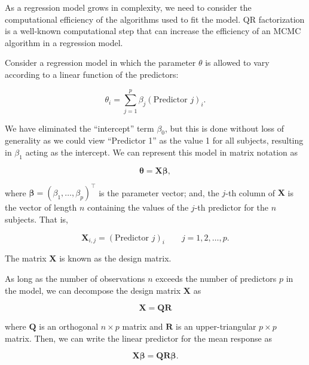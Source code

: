 \documentclass[
  letterpaper,
  DIV=11,
  numbers=noendperiod]{scrreprt}
\theoremstyle{definition}
\theoremstyle{plain}
\theoremstyle{definition}
\theoremstyle{remark}
\begin{document}
\providecommand{\norm}[1]{\lVert#1\rVert}
\providecommand{\abs}[1]{\lvert#1\rvert}
\providecommand{\iid}{\stackrel{\text{IID}}{\sim}}
\providecommand{\ind}{\stackrel{\text{Ind}}{\sim}}

\providecommand{\bm}[1]{\mathbf{#1}}
\providecommand{\bs}[1]{\boldsymbol{#1}}
\providecommand{\bbeta}{\bs{\beta}}

\providecommand{\Ell}{\mathcal{L}}
\providecommand{\indep}{\perp\negthickspace\negmedspace\perp}

As a regression model grows in complexity, we need to consider the
computational efficiency of the algorithms used to fit the model. QR
factorization is a well-known computational step that can increase the
efficiency of an MCMC algorithm in a regression model.

Consider a regression model in which the parameter \(\theta\) is allowed
to vary according to a linear function of the predictors:

\[\theta_i = \sum_{j=1}^{p} \beta_j (\text{Predictor } j)_i.\]

We have eliminated the ``intercept'' term \(\beta_0\), but this is done
without loss of generality as we could view ``Predictor 1'' as the value
1 for all subjects, resulting in \(\beta_1\) acting as the intercept. We
can represent this model in matrix notation as

\[\boldsymbol{\theta} = \mathbf{X} \boldsymbol{\beta},\]

where
\(\boldsymbol{\beta} = \left(\beta_1, \dotsc, \beta_p\right)^\top\) is
the parameter vector; and, the \(j\)-th column of \(\mathbf{X}\) is the
vector of length \(n\) containing the values of the \(j\)-th predictor
for the \(n\) subjects. That is,

\[\mathbf{X}_{i, j} = (\text{Predictor } j)_i \qquad j=1,2,\dots,p.\]

The matrix \(\mathbf{X}\) is known as the design matrix.

As long as the number of observations \(n\) exceeds the number of
predictors \(p\) in the model, we can decompose the design matrix
\(\mathbf{X}\) as

\[\mathbf{X} = \mathbf{Q}\mathbf{R}\]

where \(\mathbf{Q}\) is an orthogonal \(n \times p\) matrix and
\(\mathbf{R}\) is an upper-triangular \(p \times p\) matrix. Then, we
can write the linear predictor for the mean response as

\[\mathbf{X}\boldsymbol{\beta} = \mathbf{Q}\mathbf{R}\boldsymbol{\beta}.\]
\end{document}
